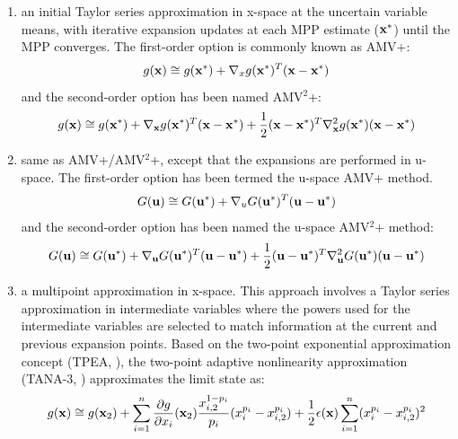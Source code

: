 \begin{enumerate}
\item an initial Taylor series approximation in x-space at the uncertain 
variable means, with iterative expansion updates at each MPP estimate
(${\bf x}^*$) until the MPP converges.  The first-order option is
commonly known as AMV+:
\begin{equation}
g({\bf x}) \cong g({\bf x}^*) + \nabla_x g({\bf x}^*)^T ({\bf x} - {\bf x}^*)
\label{eq:linear_x_mpp}
\end{equation}
and the second-order option has been named AMV$^2$+:
\begin{equation}
g({\bf x}) \cong g({\bf x}^*) + \nabla_{\bf x} g({\bf x}^*)^T 
({\bf x} - {\bf x}^*) + \frac{1}{2} ({\bf x} - {\bf x}^*)^T 
\nabla^2_{\bf x} g({\bf x}^*) ({\bf x} - {\bf x}^*) \label{eq:taylor2_x_mpp}
\end{equation}

\item same as AMV+/AMV$^2$+, except that the expansions are performed in 
u-space.  The first-order option has been termed the u-space AMV+ method.
\begin{equation}
G({\bf u}) \cong G({\bf u}^*) + \nabla_u G({\bf u}^*)^T ({\bf u} - {\bf u}^*)
\label{eq:linear_u_mpp}
\end{equation}
and the second-order option has been named the u-space AMV$^2$+ method:
\begin{equation}
G({\bf u}) \cong G({\bf u}^*) + \nabla_{\bf u} G({\bf u}^*)^T 
({\bf u} - {\bf u}^*) + \frac{1}{2} ({\bf u} - {\bf u}^*)^T 
\nabla^2_{\bf u} G({\bf u}^*) ({\bf u} - {\bf u}^*) \label{eq:taylor2_u_mpp}
\end{equation}

\item a multipoint approximation in x-space. This approach involves a 
Taylor series approximation in intermediate variables where the powers
used for the intermediate variables are selected to match information at
the current and previous expansion points.  Based on the 
two-point exponential approximation concept (TPEA, \cite{Fad90}), the 
two-point adaptive nonlinearity approximation (TANA-3, \cite{Xu98})
approximates the limit state as:
\begin{equation}
g({\bf x}) \cong g({\bf x}_2) + \sum_{i=1}^n 
\frac{\partial g}{\partial x_i}({\bf x}_2) \frac{x_{i,2}^{1-p_i}}{p_i} 
(x_i^{p_i} - x_{i,2}^{p_i}) + \frac{1}{2} \epsilon({\bf x}) \sum_{i=1}^n 
(x_i^{p_i} - x_{i,2}^{p_i})^2 \label{eq:tana_g}
\end{equation}


\end{enumerate}

